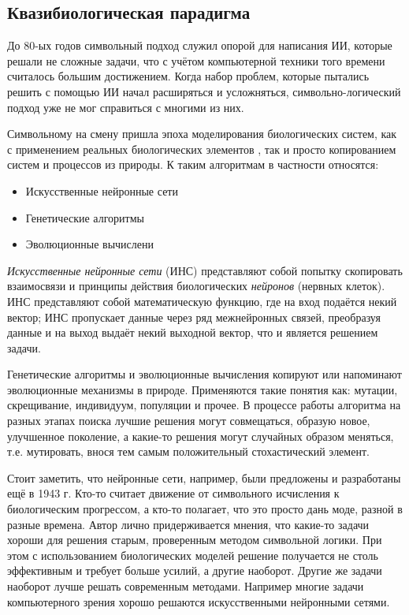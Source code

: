 \documentclass[12pt]{report}
\newenvironment{myItemize}{
	\begin{itemize}
  		\setlength{\itemsep}{1pt}
  		\setlength{\parskip}{0pt}
  		\setlength{\parsep}{0pt}
}{\end{itemize}}
\begin{document}
\subsection{Квазибиологическая парадигма}
До 80-ых годов символьный подход служил опорой для написания ИИ, которые решали не сложные задачи, что с учётом компьютерной техники того времени считалось большим достижением. Когда набор проблем, которые пытались решить с помощью ИИ начал расширяться и усложняться, символьно-логический подход уже не мог справиться с многими из них.

Символьному на смену пришла эпоха моделирования биологических систем, как с применением реальных биологических элементов \citep{rambidi2002}, так и просто копированием систем и процессов из природы. К таким алгоритмам в частности относятся:

\begin{samepage}

\begin{myItemize}
\item Искусственные нейронные сети
\item Генетические алгоритмы
\item Эволюционные вычислени
\end{myItemize}
\end{samepage}
\emph{Искусственные нейронные сети} (ИНС) представляют собой попытку скопировать взаимосвязи и принципы действия биологических \emph{нейронов} (нервных клеток). ИНС представляют собой математическую функцию, где на вход подаётся некий вектор; ИНС пропускает данные через ряд межнейронных связей, преобразуя данные и на выход выдаёт некий выходной вектор, что и является решением задачи.\cite{haykin1994neural}

Генетические алгоритмы и эволюционные вычисления копируют или напоминают эволюционные механизмы в природе. Применяются такие понятия как: мутации, скрещивание, индивидуум, популяции и прочее. В процессе работы алгоритма на разных этапах поиска лучшие решения могут совмещаться, образую новое, улучшенное поколение, а какие-то решения могут случайных образом меняться, т.е. мутировать, внося тем самым положительный стохастический элемент.\citep{russell1995}

Стоит заметить, что нейронные сети, например, были предложены и разработаны ещё в 1943 г. \citep{mcculloch1943} Кто-то считает движение от символьного исчисления к биологическим прогрессом, а кто-то полагает, что это просто дань моде, разной в разные времена. \citep{millington2009} Автор лично придерживается мнения, что какие-то задачи хороши для решения старым, проверенным методом символьной логики. При этом с использованием биологических моделей решение получается не столь эффективным и требует больше усилий, а другие наоборот. Другие же задачи наоборот лучше решать современным методами. Например многие задачи компьютерного зрения хорошо решаются искусственными нейронными сетями. \citep{haykin1994neural}
\end{document}
